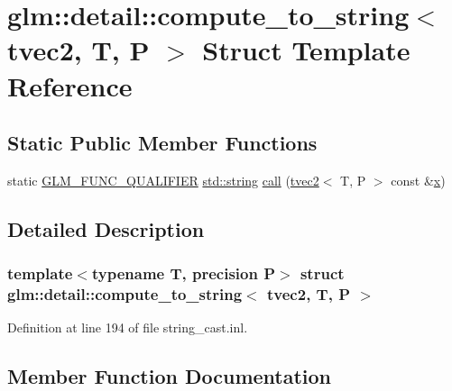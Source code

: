 \hypertarget{structglm_1_1detail_1_1compute__to__string_3_01tvec2_00_01_t_00_01_p_01_4}{}\section{glm\+::detail\+::compute\+\_\+to\+\_\+string$<$ tvec2, T, P $>$ Struct Template Reference}
\label{structglm_1_1detail_1_1compute__to__string_3_01tvec2_00_01_t_00_01_p_01_4}
\subsection*{Static Public Member Functions}
\begin{DoxyCompactItemize}
\item 
static \mbox{\hyperlink{setup_8hpp_a33fdea6f91c5f834105f7415e2a64407}{G\+L\+M\+\_\+\+F\+U\+N\+C\+\_\+\+Q\+U\+A\+L\+I\+F\+I\+ER}} \mbox{\hyperlink{glad_8h_ac83513893df92266f79a515488701770}{std\+::string}} \mbox{\hyperlink{structglm_1_1detail_1_1compute__to__string_3_01tvec2_00_01_t_00_01_p_01_4_adf2e2875ee41bafdadd331fe4760e435}{call}} (\mbox{\hyperlink{structglm_1_1tvec2}{tvec2}}$<$ T, P $>$ const \&\mbox{\hyperlink{glad_8h_a92d0386e5c19fb81ea88c9f99644ab1d}{x}})
\end{DoxyCompactItemize}


\subsection{Detailed Description}
\subsubsection*{template$<$typename T, precision P$>$\newline
struct glm\+::detail\+::compute\+\_\+to\+\_\+string$<$ tvec2, T, P $>$}



Definition at line 194 of file string\+\_\+cast.\+inl.



\subsection{Member Function Documentation}
\mbox{\label{structglm_1_1detail_1_1compute__to__string_3_01tvec2_00_01_t_00_01_p_01_4_adf2e2875ee41bafdadd331fe4760e435}} 
